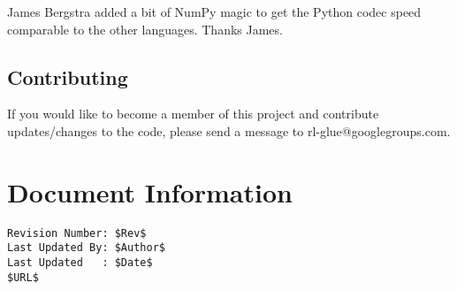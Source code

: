 \documentclass[11pt]{article}
\begin{document}
James Bergstra  added a bit of NumPy magic to get the Python codec speed comparable to the other languages.  Thanks James.


\subsection{Contributing}
If you would like to become a member of this project and contribute updates/changes to the code, please send a message to rl-glue@googlegroups.com.


\section*{Document Information}
\begin{verbatim}
Revision Number: $Rev$
Last Updated By: $Author$
Last Updated   : $Date$
$URL$
\end{verbatim}
\end{document}
